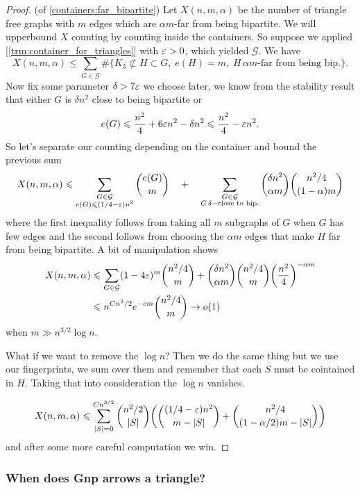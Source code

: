 \begin{proof}
	(of \ref{containers:far_bipartite}) Let $X(n,m,\alpha)$ be the
	number  of  triangle free graphs with $m$ edges which are $\alpha
	m$-far from being bipartite.
	We will upperbound $X$ counting by counting inside the containers.
	So suppose we applied [\ref{trm:container_for_triangles}] with
	$\varepsilon>0$, which yielded $\mathcal{G}$.
	We have
	\[
		X(n,m,\alpha) \leq \sum_{G \in \mathcal{G}} \#\{ K_3 \not \subset H
		\subset G,\; e(H) = m,\; H\,\alpha m\text{-far from being bip.}\}.
	\]
	Now fix some parameter $\delta > 7\varepsilon$ we choose later, we know
	from the stability result that either $G$ is $\delta n^2$ close to
	being bipartite or
	\[
		e(G) \leqslant \frac{n^2}{4} + 6\varepsilon n^2 - \delta n^2 \leqslant \frac{n^2}{4}
		- \varepsilon n^2.
	\]
	So let's separate our counting depending on the container and bound
	the previous sum
	\[
		X(n,m,\alpha) \leqslant \sum_{\substack{G \in \mathcal{G}\\e(G) \leqslant
		(1/4 - \varepsilon)n^2}} \binom{e(G)}{m}\quad
		+ \quad\sum_{\substack{G \in \mathcal{G}\\G\, \delta-\text{close to
		bip.}}} \binom{\delta n^2}{\alpha m} \binom{n^2/4}{(1-\alpha)m}
	\]
	where the first inequality follows from taking all $m$ subgraphs of
	$G$ when $G$ has few edges and the second follows from choosing the
	$\alpha m$ edges
	that make $H$ far from being bipartite. A bit of manipulation shows
	\begin{align*}
		X(n,m,\alpha) &\leqslant \sum_{G \in \mathcal{G}} (1-4\varepsilon)^m
		\binom{n^2/4}{m} + \binom{\delta n^2}{\alpha
		m}\binom{n^2/4}{m}\bigg(\frac{n^2}{4}\bigg)^{-\alpha m}\\
		&\leqslant n^{Cn^3/2}e^{-cm} \binom{n^2/4}{m} \rightarrow o(1)
	\end{align*}
	when $m \gg n^{3/2}\log n$.

	What if we want to remove the $\log n$? Then we do the same thing
	but we use our fingerprints, we sum over them and remember that each
	$S$ must be cointained in $H$.
	Taking that into consideration the $\log n$ vanishes.

	\begin{align*}
		X(n,m,\alpha) \leqslant \sum_{|S| = 0}^{Cn^{3/2}}
		\binom{n^2/2}{|S|}\bigg(\binom{(1/4-\varepsilon)n^2}{m - |S|} +
		\binom{n^2/4}{(1-\alpha/2)m - |S|}\bigg)
	\end{align*}
	and after some more careful computation we win.
\end{proof}

\subsubsection{When does Gnp arrows a triangle?}

